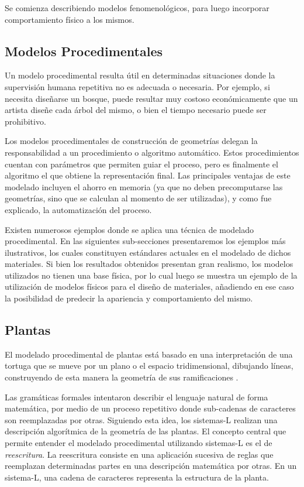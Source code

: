 Se comienza describiendo modelos fenomenológicos, para luego incorporar comportamiento físico a los mismos.

\subsection{Modelos Procedimentales}
Un modelo procedimental resulta útil en determinadas situaciones donde la supervisión humana repetitiva no es adecuada o necesaria.
Por ejemplo, si necesita diseñarse un bosque, puede resultar muy costoso económicamente que un artista diseñe cada árbol del mismo, o bien el tiempo necesario puede ser prohibitivo.

Los modelos procedimentales de construcción de geometrías delegan la responsabilidad a un procedimiento o algoritmo automático.
Estos procedimientos cuentan con parámetros que permiten guiar el proceso, pero es finalmente el algoritmo el que obtiene la representación final.
Las principales ventajas de este modelado incluyen el ahorro en memoria (ya que no deben precomputarse las geometrías, sino que se calculan al momento de ser utilizadas), y como fue explicado, la automatización del proceso.

Existen numerosos ejemplos donde se aplica una técnica de modelado procedimental.
En las siguientes sub-secciones presentaremos los ejemplos más ilustrativos, los cuales constituyen estándares actuales en el modelado de dichos materiales.
Si bien los resultados obtenidos presentan gran realismo, los modelos utilizados no tienen una base física, por lo cual luego se muestra un ejemplo de la utilización de modelos físicos para el diseño de materiales, añadiendo en ese caso la posibilidad de predecir la apariencia y comportamiento del mismo.


\subsection{Plantas}
El modelado procedimental de plantas está basado en una interpretación de una tortuga que se mueve por un plano o el espacio tridimensional, dibujando líneas, construyendo de esta manera la geometría de sus ramificaciones \cite{Prusinkiewicz1986}.

Las gramáticas formales \cite{Chomsky1956} intentaron describir el lenguaje natural de forma matemática, por medio de un proceso repetitivo donde sub-cadenas de caracteres son reemplazadas por otras.
Siguiendo esta idea, los sistemas-L \cite{Lindenmayer1968} realizan una descripción algorítmica de la geometría de las plantas.
El concepto central que permite entender el modelado procedimental utilizando sistemas-L es el de {\em reescritura}.
La reescritura consiste en una aplicación sucesiva de reglas que reemplazan determinadas partes en una descripción matemática por otras.
En un sistema-L, una cadena de caracteres representa la estructura de la planta.

